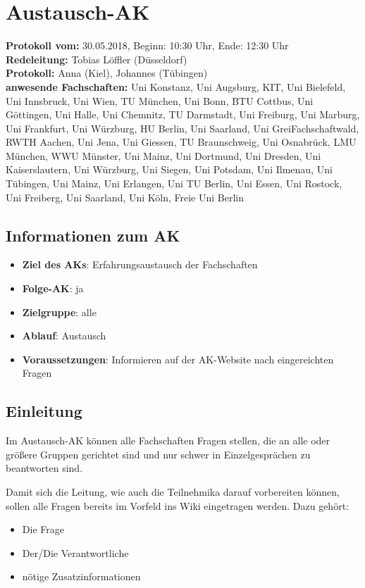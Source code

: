 
\section{Austausch-AK}

  \textbf{Protokoll vom:} 30.05.2018,
  Beginn: 10:30 Uhr,
  Ende: 12:30 Uhr \\
  \textbf{Redeleitung:} Tobias Löffler (Düsseldorf) \\
  \textbf{Protokoll:} Anna (Kiel), Johannes (Tübingen) \\
  \textbf{anwesende Fachschaften:} Uni Konstanz, Uni Augsburg, KIT, Uni Bielefeld, Uni Innsbruck, Uni Wien, TU München, Uni Bonn, BTU Cottbus, Uni Göttingen, Uni Halle, Uni Chemnitz, TU Darmstadt, Uni Freiburg, Uni Marburg, Uni Frankfurt, Uni Würzburg, HU Berlin, Uni Saarland, Uni GreiFachschaftwald, RWTH Aachen, Uni Jena, Uni Giessen, TU Braunschweig, Uni Osnabrück, LMU München, WWU Münster, Uni Mainz, Uni Dortmund, Uni Dresden, Uni Kaiserslautern, Uni Würzburg, Uni Siegen, Uni Potsdam, Uni Ilmenau, Uni Tübingen, Uni Mainz, Uni Erlangen, Uni TU Berlin, Uni Essen, Uni Rostock, Uni Freiberg, Uni Saarland, Uni Köln, Freie Uni Berlin

  \subsection*{Informationen zum AK}
    \begin{itemize}
      \item \textbf{Ziel des AKs}: Erfahrungsaustausch der Fachschaften
      \item \textbf{Folge-AK}: ja
      \item \textbf{Zielgruppe}: alle
      \item \textbf{Ablauf}: Austausch
      \item \textbf{Voraussetzungen}: Informieren auf der AK-Website nach eingereichten Fragen
    \end{itemize}

  \subsection*{Einleitung}
    Im Austausch-AK können alle Fachschaften Fragen stellen, die an alle oder größere Gruppen gerichtet sind und nur schwer in Einzelgesprächen zu beantworten sind.

    Damit sich die Leitung, wie auch die Teilnehmika darauf vorbereiten können, sollen alle Fragen bereits im Vorfeld ins Wiki eingetragen werden.
    Dazu gehört:
    \begin{itemize}
      \item Die Frage
      \item Der/Die Verantwortliche
      \item nötige Zusatzinformationen
    \end{itemize}

